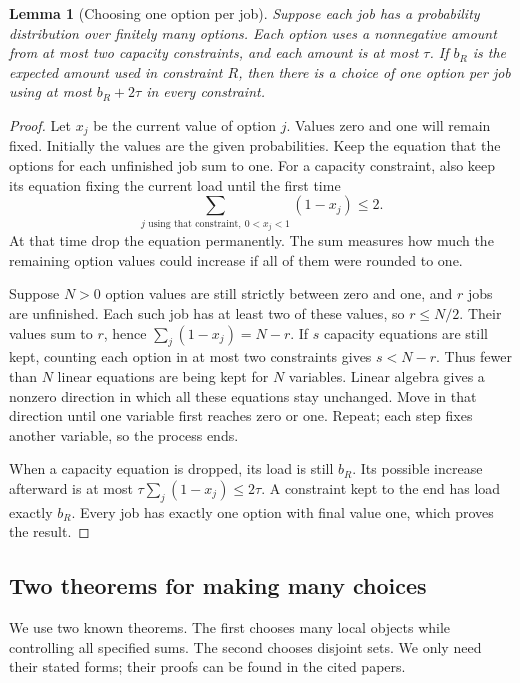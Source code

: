 \documentclass[11pt]{article}
\newtheorem{lemma}[theorem]{Lemma}
\theoremstyle{definition}\newtheorem{algorithm}{Algorithm}[section]
\numberwithin{equation}{section}
\theoremstyle{remark}\newtheorem*{remark}{Remark}
\begin{document}
\begin{lemma}[Choosing one option per job]\label{lem:two}
Suppose each job has a probability distribution over finitely many options.
Each option uses a nonnegative amount from at most two capacity constraints,
and each amount is at most $\tau$. If $b_R$ is the expected amount used
in constraint $R$, then there is a choice of one option per job using
at most $b_R+2\tau$ in every constraint.
\end{lemma}
\begin{proof}
Let $x_j$ be the current value of option $j$. Values zero and one will
remain fixed. Initially the values are the given probabilities.
Keep the equation that the options for each unfinished job sum to one.
For a capacity constraint, also keep its equation fixing the current load
until the first time
\[
 \sum_{j\text{ using that constraint},\ 0<x_j<1}(1-x_j)\le2.
\]
At that time drop the equation permanently. The sum measures how much the
remaining option values could increase if all of them were rounded to one.

Suppose $N>0$ option values are still strictly between zero and one, and
$r$ jobs are unfinished. Each such job has at least two of these values,
so $r\le N/2$. Their values sum to $r$, hence $\sum_j(1-x_j)=N-r$.
If $s$ capacity equations are still kept, counting each option in at most
two constraints gives $s<N-r$. Thus fewer than $N$ linear equations are
being kept for $N$ variables. Linear algebra gives a nonzero direction
in which all these equations stay unchanged. Move in that direction until
one variable first reaches zero or one. Repeat; each step fixes another
variable, so the process ends.

When a capacity equation is dropped, its load is still $b_R$. Its possible
increase afterward is at most $\tau\sum_j(1-x_j)\le2\tau$. A constraint
kept to the end has load exactly $b_R$. Every job has exactly one option
with final value one, which proves the result.
\end{proof}

\subsection{Two theorems for making many choices}\label{sec:inputs}
We use two known theorems. The first chooses many local objects while
controlling all specified sums. The second chooses disjoint sets. We only
need their stated forms; their proofs can be found in the cited papers.
\end{document}
